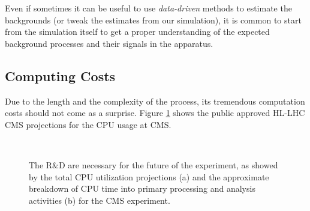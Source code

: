 Even if sometimes it can be useful to use \emph{data-driven} methods to estimate the backgrounds (or tweak the estimates from our simulation), it is common to start from the simulation itself to get a proper understanding of the expected background processes and their signals in the apparatus.

\subsection{Computing Costs}

Due to the length and the complexity of the process, its tremendous computation costs should not come as a surprise. Figure \ref{fig:cpuusage} shows the public approved HL-LHC CMS projections for the CPU usage at CMS.

\begin{figure}
    \myfloatalign
     \\
    \caption[Computing estimates]{The R$\&$D are necessary for the future of the experiment, as showed by the total CPU utilization projections (a) and the approximate breakdown of CPU time into primary processing and analysis activities (b) for the CMS experiment.}\label{fig:cpuusage}
\end{figure}

